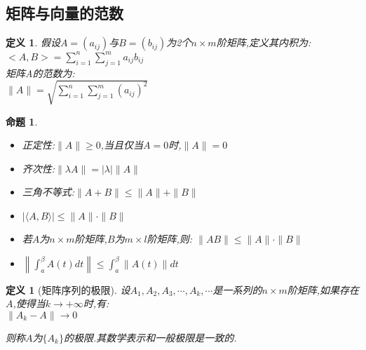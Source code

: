 \documentclass[12pt, a4paper, oneside]{ctexbook}
\newtheorem{definition}[theorem]{定义}
\newtheorem{proposition}[theorem]{命题}
\begin{document}
        \subsection{矩阵与向量的范数}
            \begin{definition}
                假设$A=(a_{ij})$与$B=(b_{ij})$为2个$n\times m$阶矩阵,定义其内积为:\\
                \centering $<A,B>=\sum^n_{i=1}\sum_{j=1}^{m}a_{ij}b_{ij} $\\
                矩阵A的范数为:\\
                \centering $\|A\|=\sqrt{\sum_{i=1}^{n}\sum_{j=1}^{m}(a_{ij})^2 }$
            \end{definition}
            \begin{proposition}
                \begin{itemize}
                    关于范数与内积:\par
                    \item[1.]正定性:$\|A\|\geq 0$,当且仅当$A=0$时,$\|A\|=0$
                    \item[2.]齐次性:$\|\lambda A\|=|\lambda |\|A\|$
                    \item[3.]三角不等式:$\|A+B\|\leq\|A\|+\|B\|$
                    \item[4.]$|\langle A,B\rangle|\leq\|A\|\cdot\|B\|$
                    \item[5.]若$A$为$n\times m$阶矩阵,$B$为$m\times l$阶矩阵,则: $\|AB\|\leq\|A\|\cdot\|B\|$
                    \item[6.]$\left\|\int_{a}^{\beta}A(t)dt\right\|\leq \int_{a}^{\beta}\|A(t)\|dt$
                \end{itemize}
            \end{proposition}
            \begin{definition}[矩阵序列的极限]
                设$A_1,A_2,A_3,\cdots,A_k,\cdots$是一系列的$n\times m$阶矩阵,如果存在$A$,使得当$k \rightarrow+\infty$时,有:\\
                \centering $\|A_k-A\|\rightarrow 0$\\
                \raggedright 则称$A$为$\{A_k\}$的极限.其数学表示和一般极限是一致的.
            \end{definition}
\end{document}
